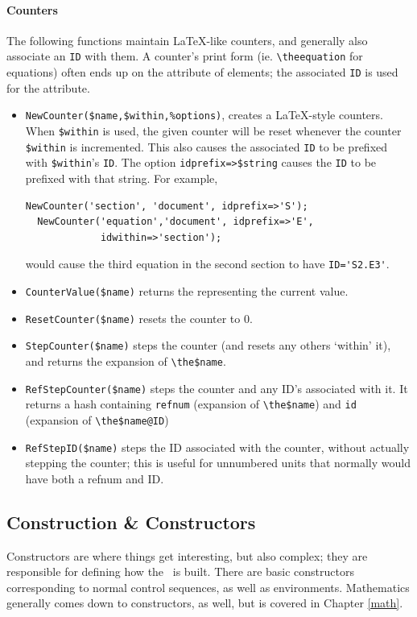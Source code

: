 \documentclass{book}
\newcommand{\ltxcode}{\lstinline[style=latexml]}
\begin{document}
\paragraph{Counters}
The following functions maintain \LaTeX-like counters, and generally
also associate an \texttt{ID} with them.  A counter's print form
(ie. \verb|\theequation| for equations) often ends up on the  attribute
of elements; the associated \texttt{ID} is used for the  attribute.
\begin{itemize}
\item \ltxcode|NewCounter($name,$within,%
  creates a \LaTeX-style counters.  When \ltxcode|$within| is used, 
  the given counter will be reset whenever the counter \ltxcode|$within| is incremented.
  This also causes the associated \texttt{ID} to be prefixed with \ltxcode|$within|'s \texttt{ID}.
  The option \ltxcode|idprefix=>$string| causes the \texttt{ID} to be prefixed with that string.
  For example,
\begin{lstlisting}[style=latexml]
  NewCounter('section', 'document', idprefix=>'S');
  NewCounter('equation','document', idprefix=>'E',
             idwithin=>'section');
\end{lstlisting}
would cause the third equation in the second section to have \verb|ID='S2.E3'|.
\item  \ltxcode|CounterValue($name)| returns the  representing the current value.
\item  \ltxcode|ResetCounter($name)| resets the counter to 0.
\item \ltxcode|StepCounter($name)| steps the counter (and resets any others `within' it),
  and returns the expansion of \verb|\the$name|.
\item \ltxcode|RefStepCounter($name)| steps the counter and any ID's associated with it.
  It returns a hash containing \texttt{refnum} (expansion of \verb|\the$name|)
  and \texttt{id} (expansion of \verb|\the$name@ID|)
\item \ltxcode|RefStepID($name)| steps the ID associated with the counter, without
  actually stepping the counter; this is useful for unnumbered units that normally
  would have both a refnum and ID.
\end{itemize}

\subsection[Construction]{Construction \& Constructors}\label{customization.latexml.construction}
Constructors are where things get interesting, but also complex; they are
responsible for defining how the \XML\ is built.  There are basic
constructors corresponding to normal control sequences, as well as
environments. Mathematics generally comes down to constructors, as well,
but is covered in Chapter \ref{math}.
\end{document}
